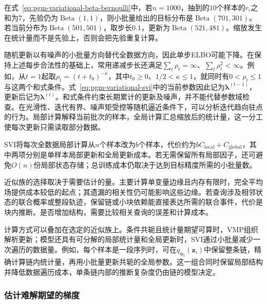 在式~\eqref{eq:pgm-variational-beta-bernoulli}中，若$n=1000$，抽到的$10$个样本的$r_i$之和为$7$，先验仍为$\operatorname{Beta}(1,1)$，则小批量给出的目标分布是$\operatorname{Beta}(701,301)$。若当前分布为$\operatorname{Beta}(501,501)$，取步长$0.1$，更新为$\operatorname{Beta}(521,481)$。缩放发生在统计量而不是先验上，否则会把先验重复计算。

随机更新以有噪声的小批量方向替代全数据方向，因此单步ELBO可能下降。在保持上述每步合法性的基础上，常用递减步长还满足$\sum_t\rho_t=\infty$、$\sum_t\rho_t^2<\infty$。例如，从$t=1$起取$\rho_t=(t+t_0)^{-\kappa}$，其中$t_0\geq0$、$1/2<\kappa\leq1$，就同时有$0<\rho_t\leq1$与这两个和式条件。式~\eqref{eq:pgm-variational-svi}中的当前参数因此记为$\bm\lambda^{(t-1)}$，更新后记为$\bm\lambda^{(t)}$。和式条件约束长期累计的更新及噪声，并不能代替参数域检查。在光滑性、迭代有界、噪声矩受控等随机逼近条件下，可以分析迭代趋向驻点的行为。局部计算解释当前批次的样本，全局计算汇总缩放后的统计量，这一分工使每次更新只需读取部分数据。

SVI将每次全数据局部计算从$n$个样本改为$b$个样本，代价约为$bC_{\mathrm{local}}+C_{\mathrm{global}}$，其中两项分别是单样本局部更新和全局更新成本。若无需保留所有局部因子，还可避免$O(n)$份局部状态存储；总训练成本仍取决于达到目标精度所需的小批量数。

近似族的选择取决于需要估计的量。主要计算单变量边缘且内存有限时，完全平均场提供成本较低的起点；其遗漏的相关性仍可能影响这些边缘。若查询涉及相邻状态的联合概率或整段轨迹，保留链或小块依赖能直接表达所需的联合事件，代价是块内推断。是否增加结构，需要比较相关查询的误差和计算成本。

计算方式可以叠加在选定的近似族上。条件共轭且统计量期望可算时，VMP组织解析更新；模型还具有可分解的局部统计量和全局更新时，SVI通过小批量减少一次遍历的数据量。例如，每个样本是一段序列时，可在$q_{\bm\phi_i}(\bm z_i)$中保留整条链，精确计算链内统计量，再用小批量更新共轭的全局参数。这一组合同时保留局部结构并降低数据遍历成本，单条链内部的推断复杂度仍由链的模型决定。

\subsubsection{估计难解期望的梯度}
\label{sec:pgm-variational-gradient-estimation}

